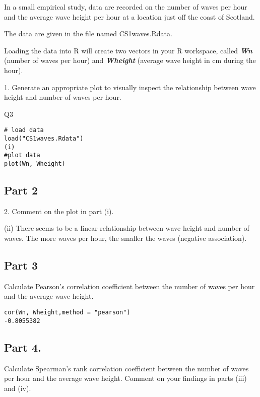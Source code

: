 \documentclass[a4paper,12pt]{article}
\begin{document}
\large

\noindent In a small empirical study, data are recorded on the number of waves per hour and the
average wave height per hour at a location just off the coast of Scotland. 

The data are
given in the file named CS1waves.Rdata. 

Loading the data into R will create two
vectors in your R workspace, called \textbf{\textit{Wn}} (number of waves per hour) and \textbf{\textit{Wheight}}
(average wave height in cm during the hour).

1. Generate an appropriate plot to visually inspect the relationship between wave
height and number of waves per hour.




Q3
\begin{framed}\begin{verbatim}
# load data
load("CS1waves.Rdata")
(i)
#plot data
plot(Wn, Wheight)
\end{verbatim}\end{framed}

\subsection*{Part 2}
2. Comment on the plot in part (i).

(ii)
There seems to be a linear relationship between wave height and number of waves.
The more waves per hour, the smaller the waves (negative association).


\subsection*{ Part 3}

Calculate Pearson’s correlation coefficient between the number of waves per
hour and the average wave height.


\begin{framed}\begin{verbatim}
cor(Wn, Wheight,method = "pearson")
-0.8055382 
\end{verbatim}\end{framed}

\subsection*{ Part 4.}

Calculate Spearman’s rank correlation coefficient between the number of
waves per hour and the average wave height.
Comment on your findings in parts (iii) and (iv).
\end{document}
